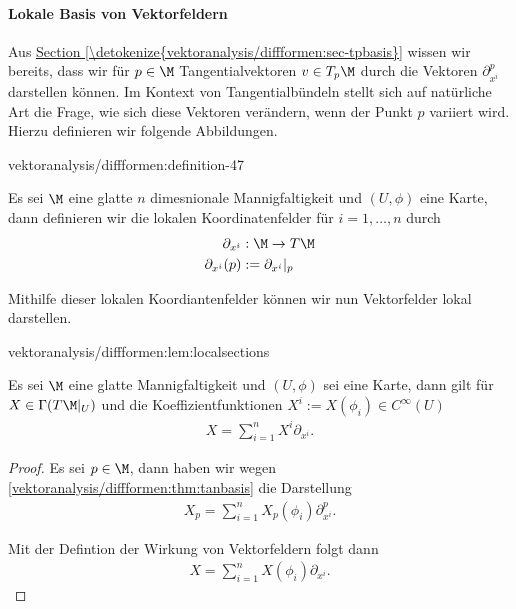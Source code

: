 \documentclass[letterpaper,10pt,english]{jupyterBook}
\begin{document}
\paragraph{Lokale Basis von Vektorfeldern}
\label{\detokenize{vektoranalysis/diffformen:lokale-basis-von-vektorfeldern}}
\par
Aus \hyperref[\detokenize{vektoranalysis/diffformen:sec-tpbasis}]{Section \ref{\detokenize{vektoranalysis/diffformen:sec-tpbasis}}} wissen wir bereits, dass wir für \(p\in\M\) Tangentialvektoren \(v\in T_p\M\) durch die Vektoren \(\partial_{x^i}^p\) darstellen können. Im Kontext von Tangentialbündeln stellt sich auf natürliche Art die Frage, wie sich diese Vektoren verändern, wenn der Punkt \(p\) variiert wird. Hierzu definieren wir folgende Abbildungen.
\begin{definition}{}{vektoranalysis/diffformen:definition-47}



\par
Es sei \(\M\) eine glatte \(n\) dimesnionale Mannigfaltigkeit und \((U,\phi)\) eine Karte, dann definieren wir die lokalen Koordinatenfelder
für \(i=1,\ldots,n\) durch
\begin{align*}
\partial_{x^{i}}&:\M\to T\M\\
\partial_{x^{i}}(p)&:= \partial_{x^{i}}\rvert_p
\end{align*}\end{definition}

\par
Mithilfe dieser lokalen Koordiantenfelder können wir nun Vektorfelder lokal darstellen.
\begin{lemma}{}{vektoranalysis/diffformen:lem:localsections}



\par
Es sei \(\M\) eine glatte Mannigfaltigkeit und \((U,\phi)\) sei eine Karte, dann gilt für \(X\in\Gamma(T\M\rvert_U)\) und die Koeffizientfunktionen \(X^i:=X(\phi_i)\in C^\infty(U)\)
\begin{align*}
X = \sum_{i=1}^n X^i \partial_{x^{i}}.
\end{align*}\end{lemma}

\begin{proof}
 Es sei \(p\in\M\), dann haben wir wegen  \cref{vektoranalysis/diffformen:thm:tanbasis} die Darstellung
\begin{align*}
X_p = \sum_{i=1}^n X_p(\phi_i) \partial_{x^i}^p.
\end{align*}
\par
Mit der Defintion der Wirkung von Vektorfeldern folgt dann
\begin{align*}
X = \sum_{i=1}^n X(\phi_i) \partial_{x^i}.
\end{align*}\end{proof}
\end{document}
